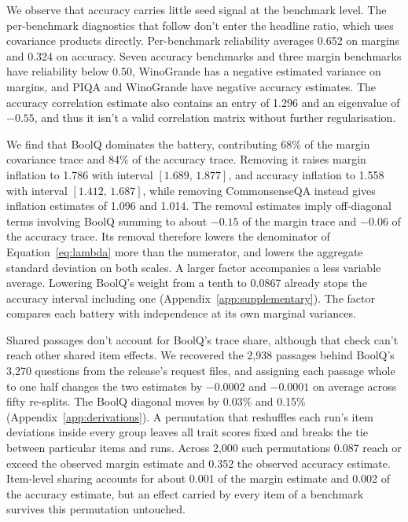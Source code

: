 \documentclass{article}
\newcommand{\ci}[2]{\ensuremath{[#1,\,#2]}}
\begin{document}
We observe that accuracy carries little seed signal at the benchmark level. The per-benchmark diagnostics that follow don't enter the headline ratio, which uses covariance products directly. Per-benchmark reliability averages 0.652 on margins and 0.324 on accuracy. Seven accuracy benchmarks and three margin benchmarks have reliability below 0.50, WinoGrande has a negative estimated variance on margins, and PIQA and WinoGrande have negative accuracy estimates. The accuracy correlation estimate also contains an entry of 1.296 and an eigenvalue of $-0.55$, and thus it isn't a valid correlation matrix without further regularisation.

We find that BoolQ dominates the battery, contributing 68\% of the margin covariance trace and 84\% of the accuracy trace. Removing it raises margin inflation to 1.786 with interval \ci{1.689}{1.877}, and accuracy inflation to 1.558 with interval \ci{1.412}{1.687}, while removing CommonsenseQA instead gives inflation estimates of 1.096 and 1.014. The removal estimates imply off-diagonal terms involving BoolQ summing to about $-0.15$ of the margin trace and $-0.06$ of the accuracy trace. Its removal therefore lowers the denominator of Equation~\ref{eq:lambda} more than the numerator, and lowers the aggregate standard deviation on both scales. A larger factor accompanies a less variable average. Lowering BoolQ's weight from a tenth to 0.0867 already stops the accuracy interval including one (Appendix~\ref{app:supplementary}). The factor compares each battery with independence at its own marginal variances.

Shared passages don't account for BoolQ's trace share, although that check can't reach other shared item effects. We recovered the 2,938 passages behind BoolQ's 3,270 questions from the release's request files, and assigning each passage whole to one half changes the two estimates by $-0.0002$ and $-0.0001$ on average across fifty re-splits. The BoolQ diagonal moves by 0.03\% and 0.15\% (Appendix~\ref{app:derivations}). A permutation that reshuffles each run's item deviations inside every group leaves all trait scores fixed and breaks the tie between particular items and runs. Across 2,000 such permutations 0.087 reach or exceed the observed margin estimate and 0.352 the observed accuracy estimate. Item-level sharing accounts for about 0.001 of the margin estimate and 0.002 of the accuracy estimate, but an effect carried by every item of a benchmark survives this permutation untouched.
\end{document}
